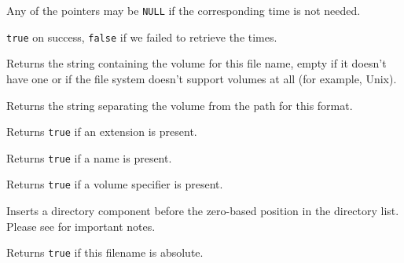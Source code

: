 Any of the pointers may be {\tt NULL} if the corresponding time is not
needed.


{\tt true} on success, {\tt false} if we failed to retrieve the times.


\label{wxfilenamegetvolume}


Returns the string containing the volume for this file name, empty if it
doesn't have one or if the file system doesn't support volumes at all (for
example, Unix).


\label{wxfilenamegetvolumeseparator}


Returns the string separating the volume from the path for this format.


\label{wxfilenamehasext}


Returns {\tt true} if an extension is present.


\label{wxfilenamehasname}


Returns {\tt true} if a name is present.


\label{wxfilenamehasvolume}


Returns {\tt true} if a volume specifier is present.


\label{wxfilenameinsertdir}


Inserts a directory component before the zero-based position in the directory
list. Please see  for important notes.


\label{wxfilenameisabsolute}


Returns {\tt true} if this filename is absolute.


\label{wxfilenameiscasesensitive}

